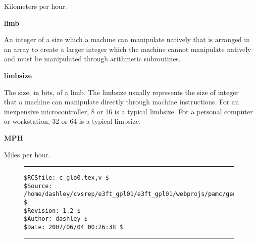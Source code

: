 \begin{vworktermglossaryenum}
      Kilometers per hour.

\item \textbf{limb}

      An integer of a size which a machine can manipulate natively
      that is arranged in an array to create a larger
      integer which the machine cannot manipulate natively and must be
      manipulated through arithmetic subroutines.

\item \textbf{limbsize}

      The size, in bits, of a limb.  The limbsize usually represents
      the size of integer that a machine can manipulate directly
      through machine instructions.  For an inexpensive microcontroller,
      8 or 16 is a typical limbsize.  For a personal computer or 
      workstation, 32 or 64 is a typical limbsize.

\item \textbf{MPH}

      Miles per hour.

\end{vworktermglossaryenum}


\noindent\begin{figure}[!b]
\noindent\rule[-0.25in]{\textwidth}{1pt}
\begin{tiny}
\begin{verbatim}
$RCSfile: c_glo0.tex,v $
$Source: /home/dashley/cvsrep/e3ft_gpl01/e3ft_gpl01/webprojs/pamc/gen_a/docs/manual/man_a/c_glo0/c_glo0.tex,v $
$Revision: 1.2 $
$Author: dashley $
$Date: 2007/06/04 00:26:38 $
\end{verbatim}
\end{tiny}
\noindent\rule[0.25in]{\textwidth}{1pt}
\end{figure}

%
%
